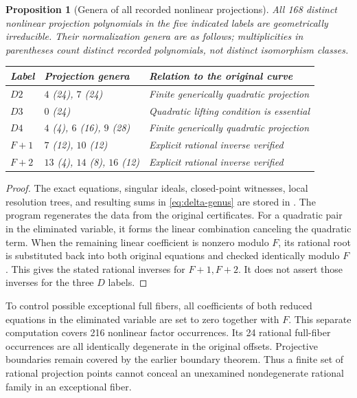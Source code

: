 \documentclass[11pt,letterpaper]{article}
\newtheorem{proposition}[theorem]{Proposition}
\theoremstyle{definition}\newtheorem{definition}[theorem]{Definition}
\theoremstyle{remark}\newtheorem{remark}[theorem]{Remark}
\begin{document}
\begin{proposition}[Genera of all recorded nonlinear projections]\label{prop:projectiongenera}
All 168 distinct nonlinear projection polynomials in the five indicated labels are geometrically irreducible. Their normalization genera are as follows; multiplicities in parentheses count distinct recorded polynomials, not distinct isomorphism classes.
\begin{center}
\begin{tabular}{lll}
\toprule
Label & Projection genera & Relation to the original curve\\
\midrule
$D2$ & $4$ (24), $7$ (24) & Finite generically quadratic projection\\
$D3$ & $0$ (24) & Quadratic lifting condition is essential\\
$D4$ & $4$ (4), $6$ (16), $9$ (28) & Finite generically quadratic projection\\
$F{+}1$ & $7$ (12), $10$ (12) & Explicit rational inverse verified\\
$F{+}2$ & $13$ (4), $14$ (8), $16$ (12) & Explicit rational inverse verified\\
\bottomrule
\end{tabular}
\end{center}
\end{proposition}
\begin{proof}
The exact equations, singular ideals, closed-point witnesses, local resolution trees, and resulting sums in \eqref{eq:delta-genus} are stored in . The program regenerates the data from the original certificates. For a quadratic pair in the eliminated variable, it forms the linear combination canceling the quadratic term. When the remaining linear coefficient is nonzero modulo $F$, its rational root is substituted back into both original equations and checked identically modulo $F$. This gives the stated rational inverses for $F{+}1,F{+}2$. It does not assert those inverses for the three $D$ labels.
\end{proof}

To control possible exceptional full fibers, all coefficients of both reduced equations in the eliminated variable are set to zero together with $F$. This separate computation covers 216 nonlinear factor occurrences. Its 24 rational full-fiber occurrences are all identically degenerate in the original offsets. Projective boundaries remain covered by the earlier boundary theorem. Thus a finite set of rational projection points cannot conceal an unexamined nondegenerate rational family in an exceptional fiber.
\end{document}
